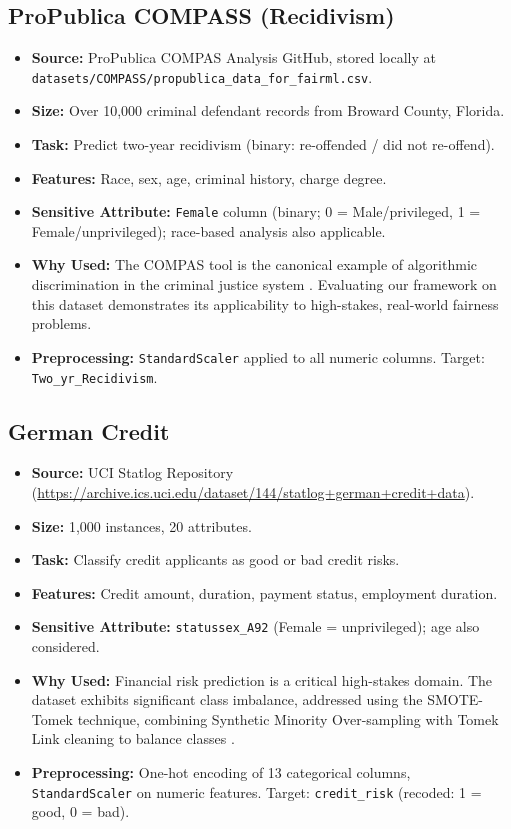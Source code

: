 \documentclass[12pt,a4paper]{article}
\begin{document}
\subsection{ProPublica COMPASS (Recidivism)}

\begin{itemize}
    \item \textbf{Source:} ProPublica COMPAS Analysis GitHub, stored locally at \texttt{datasets/COMPASS/propublica\_data\_for\_fairml.csv}.
    \item \textbf{Size:} Over 10,000 criminal defendant records from Broward County, Florida.
    \item \textbf{Task:} Predict two-year recidivism (binary: re-offended / did not re-offend).
    \item \textbf{Features:} Race, sex, age, criminal history, charge degree.
    \item \textbf{Sensitive Attribute:} \texttt{Female} column (binary; 0 = Male/privileged, 1 = Female/unprivileged); race-based analysis also applicable.
    \item \textbf{Why Used:} The COMPAS tool is the canonical example of algorithmic discrimination in the criminal justice system \cite{angwin2016machine}. Evaluating our framework on this dataset demonstrates its applicability to high-stakes, real-world fairness problems.
    \item \textbf{Preprocessing:} \texttt{StandardScaler} applied to all numeric columns. Target: \texttt{Two\_yr\_Recidivism}.
\end{itemize}

\subsection{German Credit}

\begin{itemize}
    \item \textbf{Source:} UCI Statlog Repository (\url{https://archive.ics.uci.edu/dataset/144/statlog+german+credit+data}).
    \item \textbf{Size:} 1,000 instances, 20 attributes.
    \item \textbf{Task:} Classify credit applicants as good or bad credit risks.
    \item \textbf{Features:} Credit amount, duration, payment status, employment duration.
    \item \textbf{Sensitive Attribute:} \texttt{statussex\_A92} (Female = unprivileged); age also considered.
    \item \textbf{Why Used:} Financial risk prediction is a critical high-stakes domain. The dataset exhibits significant class imbalance, addressed using the SMOTE-Tomek technique, combining Synthetic Minority Over-sampling with Tomek Link cleaning to balance classes \cite{rN2024multiobj}.
    \item \textbf{Preprocessing:} One-hot encoding of 13 categorical columns, \texttt{StandardScaler} on numeric features. Target: \texttt{credit\_risk} (recoded: 1 = good, 0 = bad).
\end{itemize}
\end{document}
